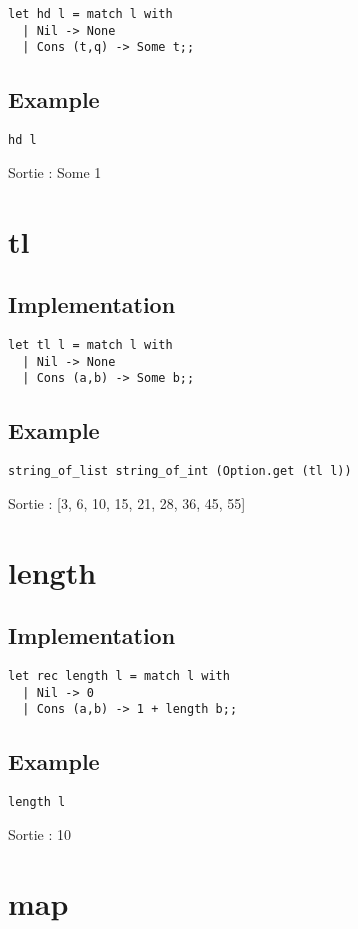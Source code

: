 \documentclass[12pt,french]{article}
\begin{document}
\begin{verbatim}
let hd l = match l with
  | Nil -> None
  | Cons (t,q) -> Some t;;
\end{verbatim}
\subsection{Example}
\begin{verbatim}
hd l
\end{verbatim}
Sortie :
Some 1
\section{tl}

\subsection{Implementation}

\begin{verbatim}
let tl l = match l with
  | Nil -> None
  | Cons (a,b) -> Some b;;
\end{verbatim}
\subsection{Example}
\begin{verbatim}
string_of_list string_of_int (Option.get (tl l))
\end{verbatim}
Sortie :
[3, 6, 10, 15, 21, 28, 36, 45, 55]
\section{length}

\subsection{Implementation}

\begin{verbatim}
let rec length l = match l with
  | Nil -> 0
  | Cons (a,b) -> 1 + length b;;
\end{verbatim}
\subsection{Example}
\begin{verbatim}
length l
\end{verbatim}
Sortie :
10
\section{map}
\end{document}
